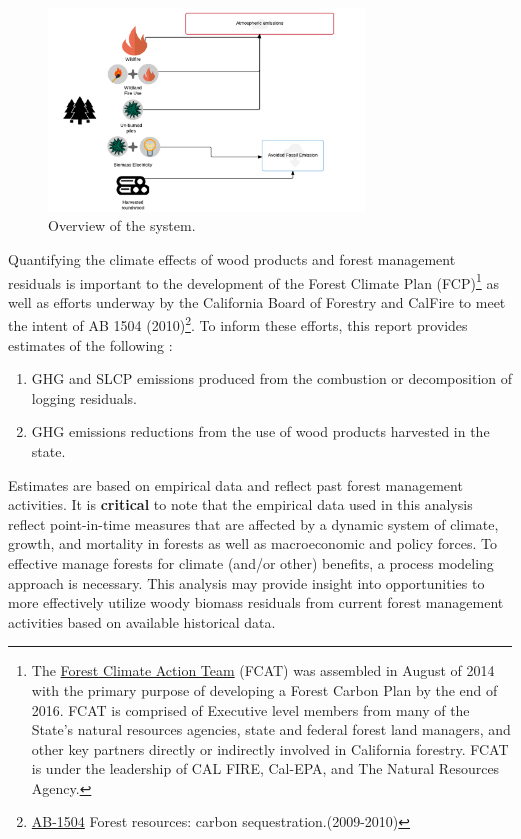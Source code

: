 \documentclass[a4paper]{article}
\begin{document}
\begin{figure}[htb]
\centering
\includegraphics[width=0.75\textwidth]{./graphics/wood_fates.pdf}
\caption{Overview of the system. \label{fig:wood_fates}}
\end{figure}


Quantifying the climate effects of wood products and forest management residuals is
important to the development of the Forest Climate Plan (FCP)\footnote{The \href{http://www.fire.ca.gov/fcat/}{Forest Climate Action Team} (FCAT) was assembled in August of 2014 with the primary purpose of developing a Forest Carbon Plan by the end of 2016. FCAT is comprised of Executive level members from many of the State’s natural resources agencies, state and federal forest land managers, and other key partners directly or indirectly involved in California forestry. FCAT is under the leadership of CAL FIRE, Cal-EPA, and The Natural Resources Agency.} as well
as efforts underway by the California Board of Forestry and CalFire to
meet the intent of AB 1504 (2010)\footnote{\href{http://leginfo.legislature.ca.gov/faces/billTextClient.xhtml?bill_id=200920100AB1504}{AB-1504} Forest resources: carbon sequestration.(2009-2010)}. To inform these efforts, this
report provides estimates of the following :

\begin{enumerate}
\item GHG and SLCP emissions produced from the combustion or
decomposition of logging residuals.
\item GHG emissions reductions from the use of wood products harvested in
the state.
\end{enumerate}

Estimates are based on empirical data and reflect past forest
management activities. It is \textbf{critical} to note that the empirical
data used in this analysis reflect point-in-time measures that are
affected by a dynamic system of climate, growth, and mortality in
forests as well as macroeconomic and policy forces. To effective
manage forests for climate (and/or other) benefits, a process modeling
approach is necessary. This analysis may provide insight into
opportunities to more effectively utilize woody biomass residuals from
current forest management activities based on available historical
data.
\end{document}
